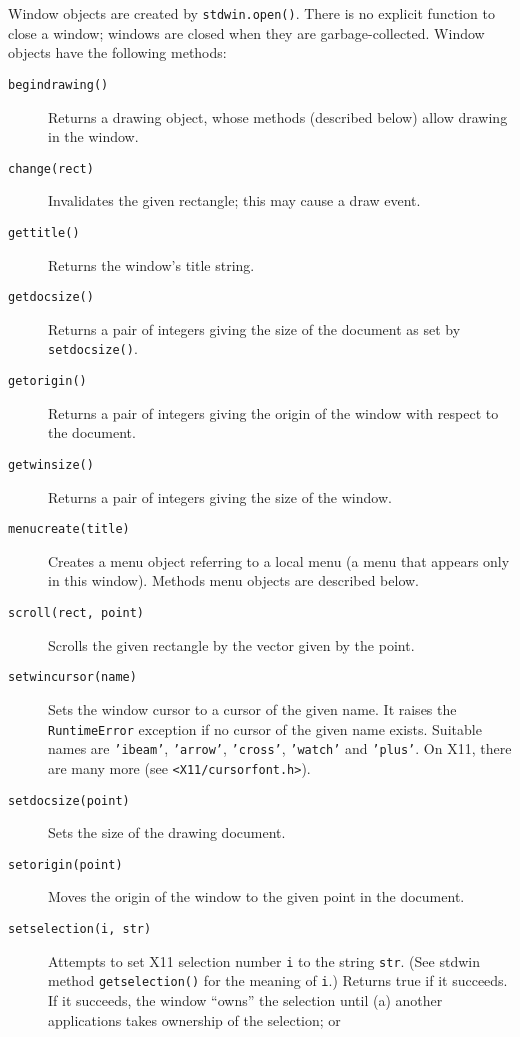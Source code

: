 Window objects are created by
{\tt stdwin.open()}.
There is no explicit function to close a window; windows are closed when
they are garbage-collected.
Window objects have the following methods:
\begin{description}
\item[{\tt begindrawing()}]
Returns a drawing object, whose methods (described below) allow drawing
in the window.
\item[{\tt change(rect)}]
Invalidates the given rectangle; this may cause a draw event.
\item[{\tt gettitle()}]
Returns the window's title string.
\item[{\tt getdocsize()}]
\begin{sloppypar}
Returns a pair of integers giving the size of the document as set by
{\tt setdocsize()}.
\end{sloppypar}
\item[{\tt getorigin()}]
Returns a pair of integers giving the origin of the window with respect
to the document.
\item[{\tt getwinsize()}]
Returns a pair of integers giving the size of the window.
\item[{\tt menucreate(title)}]
Creates a menu object referring to a local menu (a menu that appears
only in this window).
Methods menu objects are described below.
\item[{\tt scroll(rect,~point)}]
Scrolls the given rectangle by the vector given by the point.
\item[{\tt setwincursor(name)}]
\begin{sloppypar}
Sets the window cursor to a cursor of the given name.
It raises the
{\tt Runtime\-Error}
exception if no cursor of the given name exists.
Suitable names are
{\tt 'ibeam'},
{\tt 'arrow'},
{\tt 'cross'},
{\tt 'watch'}
and
{\tt 'plus'}.
On X11, there are many more (see
{\tt <X11/cursorfont.h>}).
\end{sloppypar}
\item[{\tt setdocsize(point)}]
Sets the size of the drawing document.
\item[{\tt setorigin(point)}]
Moves the origin of the window to the given point in the document.
\item[{\tt setselection(i, str)}]
Attempts to set X11 selection number
{\tt i}
to the string
{\tt str}.
(See stdwin method
{\tt getselection()}
for the meaning of
{\tt i}.)
Returns true if it succeeds.
If it succeeds, the window ``owns'' the selection until
(a) another applications takes ownership of the selection; or

\end{description}
